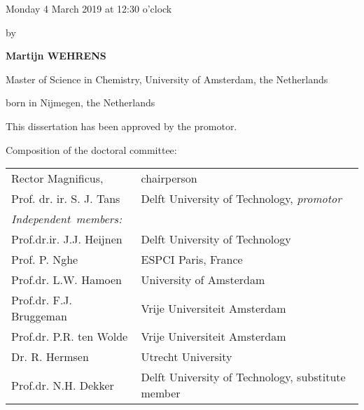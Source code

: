 \begin{titlepage}
\begin{center}
Monday 4 March 2019 at 12:30 o'clock

\bigskip
\bigskip

by

\bigskip
\bigskip

\makeatletter
{\Large\titlefont\bfseries Martijn WEHRENS}
\makeatother

\bigskip
\bigskip

Master of Science in Chemistry, %
University of Amsterdam, the Netherlands

born in Nijmegen, the Netherlands

\vspace*{2\bigskipamount}

\end{center}

\clearpage
\thispagestyle{empty}

\noindent This dissertation has been approved by the promotor.


\bigskip
\noindent Composition of the doctoral committee: 

\medskip\noindent
\begin{tabular}{p{4cm}l}
    Rector Magnificus, & chairperson \\
    Prof. dr. ir. S. J. Tans & Delft University of Technology, \textit{promotor} \\

    \medskip
    \mbox{\emph{Independent members:}} & \\    

    Prof.dr.ir. J.J. Heijnen & Delft University of Technology \\
    Prof. P. Nghe & ESPCI Paris, France \\
    Prof.dr. L.W. Hamoen & University of Amsterdam \\     
    Prof.dr. F.J. Bruggeman & Vrije Universiteit Amsterdam \\
    Prof.dr. P.R. ten Wolde & Vrije Universiteit Amsterdam \\
    Dr. R. Hermsen & Utrecht University \\  
    Prof.dr. N.H. Dekker & Delft University of Technology, substitute member \\
    


\end{tabular}
\end{titlepage}
